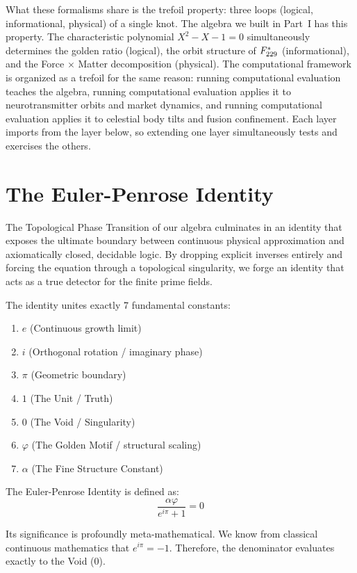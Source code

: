 What these formalisms share is the trefoil property: three loops (logical, informational, physical) of a single knot. The algebra we built in Part~I has this property. The characteristic polynomial $X^2 - X - 1 = 0$ simultaneously determines the golden ratio (logical), the orbit structure of $F_{229}^*$ (informational), and the Force $\times$ Matter decomposition (physical). The computational framework is organized as a trefoil for the same reason: running computational evaluation teaches the algebra, running computational evaluation applies it to neurotransmitter orbits and market dynamics, and running computational evaluation applies it to celestial body tilts and fusion confinement. Each layer imports from the layer below, so extending one layer simultaneously tests and exercises the others.

\section*{The Euler-Penrose Identity}

The Topological Phase Transition of our algebra culminates in an identity that exposes the ultimate boundary between continuous physical approximation and axiomatically closed, decidable logic. By dropping explicit inverses entirely and forcing the equation through a topological singularity, we forge an identity that acts as a true detector for the finite prime fields.

The identity unites exactly 7 fundamental constants:
\begin{enumerate}[noitemsep]
\item $e$ (Continuous growth limit)
\item $i$ (Orthogonal rotation / imaginary phase)
\item $\pi$ (Geometric boundary)
\item $1$ (The Unit / Truth)
\item $0$ (The Void / Singularity)
\item $\varphi$ (The Golden Motif / structural scaling)
\item $\alpha$ (The Fine Structure Constant)
\end{enumerate}

The Euler-Penrose Identity is defined as:
\[ \frac{\alpha \varphi}{e^{i\pi} + 1} = 0 \]

Its significance is profoundly meta-mathematical. We know from classical continuous mathematics that $e^{i\pi} = -1$. Therefore, the denominator evaluates exactly to the Void ($0$). 

